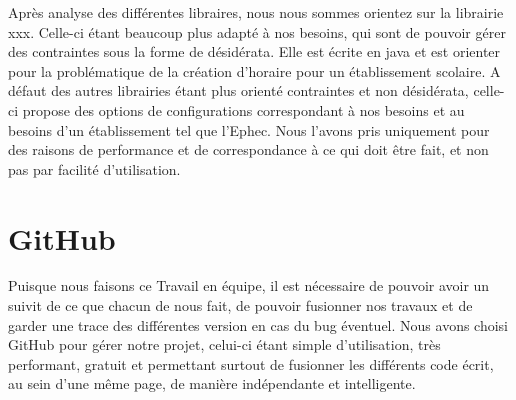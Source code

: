 Après analyse des différentes libraires, nous nous sommes orientez sur la
librairie xxx. Celle-ci étant beaucoup plus adapté à nos besoins, qui sont de
pouvoir gérer des contraintes sous la forme de désidérata. Elle est écrite en java et est orienter pour la problématique de la création d'horaire pour un établissement scolaire. A défaut des autres librairies étant plus orienté contraintes et non désidérata, celle-ci propose des options de configurations correspondant à nos besoins et au besoins d'un établissement tel que l'Ephec. Nous l'avons pris uniquement pour des raisons de performance et de correspondance à ce qui doit être fait, et non pas par facilité d'utilisation.

\section{GitHub}
Puisque nous faisons ce Travail en équipe, il est nécessaire de pouvoir avoir un suivit de ce que chacun de nous fait, de pouvoir fusionner nos travaux et de garder une trace des différentes version en cas du bug éventuel. Nous avons choisi GitHub pour gérer notre projet, celui-ci étant simple d'utilisation, très performant, gratuit et permettant surtout de fusionner les différents code écrit, au sein d'une même page, de manière indépendante et intelligente.

